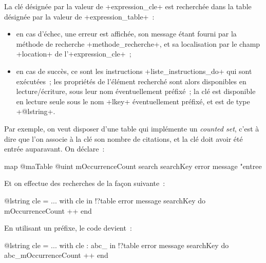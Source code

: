 La clé désignée par la valeur de \ggs+expression_cle+ est recherchée dans la table désignée par la valeur de \ggs+expression_table+~:
\begin{itemize}
  \item en cas d'échec, une erreur est affichée, son message étant fourni par la méthode de recherche \ggs+methode_recherche+, et sa localisation par le champ \ggs+location+ de l'\ggs+expression_cle+~;
  \item en cas de succès, ce sont les instructions \ggs+liste_instructions_do+ qui sont exécutées~; les propriétés de l'élément recherché sont alors disponibles en lecture/écriture, sous leur nom éventuellement préfixé~; la clé est disponible en lecture seule sous le nom \ggs+lkey+ éventuellement préfixé, et est de type \ggs+@lstring+.
\end{itemize}

Par exemple, on veut disposer d'une table qui implémente un \emph{counted set}, c'est à dire que l'on associe à la clé son nombre de citations, et la clé doit avoir été entrée auparavant. On déclare~:
\begin{galgas}
map @maTable {
  @uint mOccurrenceCount
  search searchKey error message "entree %
}
\end{galgas}

Et on effectue des recherches de la façon suivante~:
\begin{galgas}
@lstring cle = ...
with cle in !?table error message searchKey do
  mOccurrenceCount ++
end
\end{galgas}

En utilisant un préfixe, le code devient~:
\begin{galgas}
@lstring cle = ...
with cle : abc_ in !?table error message searchKey do
  abc_mOccurrenceCount ++
end
\end{galgas}

